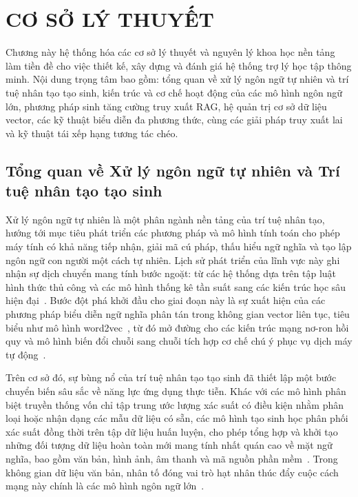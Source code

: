 \chapter{CƠ SỞ LÝ THUYẾT}
\label{chapter:co_so_ly_thuyet}

Chương này hệ thống hóa các cơ sở lý thuyết và nguyên lý khoa học nền tảng làm tiền đề cho việc thiết kế, xây dựng và đánh giá hệ thống trợ lý học tập thông minh. Nội dung trọng tâm bao gồm: tổng quan về xử lý ngôn ngữ tự nhiên và trí tuệ nhân tạo tạo sinh, kiến trúc và cơ chế hoạt động của các mô hình ngôn ngữ lớn, phương pháp sinh tăng cường truy xuất RAG, hệ quản trị cơ sở dữ liệu vector, các kỹ thuật biểu diễn đa phương thức, cùng các giải pháp truy xuất lai và kỹ thuật tái xếp hạng tương tác chéo.

\section{Tổng quan về Xử lý ngôn ngữ tự nhiên và Trí tuệ nhân tạo tạo sinh}
Xử lý ngôn ngữ tự nhiên là một phân ngành nền tảng của trí tuệ nhân tạo, hướng tới mục tiêu phát triển các phương pháp và mô hình tính toán cho phép máy tính có khả năng tiếp nhận, giải mã cú pháp, thấu hiểu ngữ nghĩa và tạo lập ngôn ngữ con người một cách tự nhiên. Lịch sử phát triển của lĩnh vực này ghi nhận sự dịch chuyển mang tính bước ngoặt: từ các hệ thống dựa trên tập luật hình thức thủ công và các mô hình thống kê tần suất sang các kiến trúc học sâu hiện đại~\cite{bengio2003neural, lecun2015deeplearning}. Bước đột phá khởi đầu cho giai đoạn này là sự xuất hiện của các phương pháp biểu diễn ngữ nghĩa phân tán trong không gian vector liên tục, tiêu biểu như mô hình word2vec~\cite{mikolov2013word2vec}, từ đó mở đường cho các kiến trúc mạng nơ-ron hồi quy và mô hình biến đổi chuỗi sang chuỗi tích hợp cơ chế chú ý phục vụ dịch máy tự động~\cite{sutskever2014seq2seq, bahdanau2015attention}.

Trên cơ sở đó, sự bùng nổ của trí tuệ nhân tạo tạo sinh đã thiết lập một bước chuyển biến sâu sắc về năng lực ứng dụng thực tiễn. Khác với các mô hình phân biệt truyền thống vốn chỉ tập trung ước lượng xác suất có điều kiện nhằm phân loại hoặc nhận dạng các mẫu dữ liệu có sẵn, các mô hình tạo sinh học phân phối xác suất đồng thời trên tập dữ liệu huấn luyện, cho phép tổng hợp và khởi tạo những đối tượng dữ liệu hoàn toàn mới mang tính nhất quán cao về mặt ngữ nghĩa, bao gồm văn bản, hình ảnh, âm thanh và mã nguồn phần mềm~\cite{bommasani2021foundation}. Trong không gian dữ liệu văn bản, nhân tố đóng vai trò hạt nhân thúc đẩy cuộc cách mạng này chính là các mô hình ngôn ngữ lớn~\cite{zhao2023llmsurvey}.

